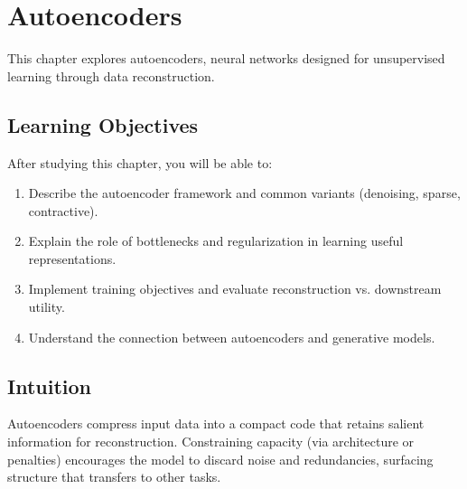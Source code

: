 
\chapter{Autoencoders}
\label{chap:autoencoders}

This chapter explores autoencoders, neural networks designed for unsupervised learning through data reconstruction.


\section*{Learning Objectives}

After studying this chapter, you will be able to:

\begin{enumerate}
    \item Describe the autoencoder framework and common variants (denoising, sparse, contractive).
    \item Explain the role of bottlenecks and regularization in learning useful representations.
    \item Implement training objectives and evaluate reconstruction vs. downstream utility.
    \item Understand the connection between autoencoders and generative models.
\end{enumerate}



\section*{Intuition}

Autoencoders compress input data into a compact code that retains salient information for reconstruction. Constraining capacity (via architecture or penalties) encourages the model to discard noise and redundancies, surfacing structure that transfers to other tasks.











